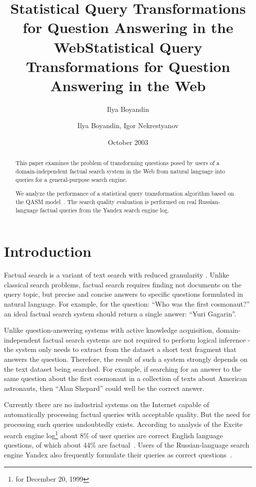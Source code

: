 \documentclass{article}
\title{Statistical Query Transformations for Question Answering in the Web}
\author{Ilya Boyandin}
\date{October 2003}
\title{Statistical Query Transformations for Question Answering in the Web}
\author{Ilya Boyandin, Igor Nekrestyanov}
\begin{document}
\maketitle

\begin{abstract}
This paper examines the problem of transforming questions posed by users 
of a domain-independent factual search system in the Web from natural language 
into queries for a general-purpose search engine.

We analyze the performance of a statistical query transformation algorithm
based on the QASM model~\cite{qa:radev:qasm}.
The search quality evaluation is performed on real Russian-language factual queries
from the Yandex search engine log.

\end{abstract}


\section{Introduction}

Factual search is a variant of text search with reduced granularity \cite{irg:websearch}. 
Unlike classical search problems, factual search requires finding not documents on the query topic,
but precise and concise answers to specific questions formulated in natural language. 
For example, for the question: ``Who was the first cosmonaut?'' an ideal
factual search system should return a single answer: ``Yuri Gagarin''.

Unlike question-answering systems with active knowledge acquisition,
domain-independent factual search systems are not required to perform logical inference -
the system only needs to extract from the dataset a short text fragment
that answers the question.
Therefore, the result of such a system strongly depends on the text
dataset being searched. For example, if
searching for an answer to the same question about the first cosmonaut in a collection
of texts about American astronauts,
then ``Alan Shepard'' could well be the correct answer.

Currently there are no industrial systems on the Internet
capable of automatically processing factual queries with
acceptable quality. But the need for processing such queries
undoubtedly exists. According to analysis of the Excite search
engine log\footnote{for December 20, 1999} about 8\% of user
queries are
correct English language questions,
of which about 44\% are factual~\cite{qa:Tritus}.
Users of the Russian-language search engine Yandex also frequently formulate
their queries as correct questions~\cite{yandex:voprosy}.
\end{document}
